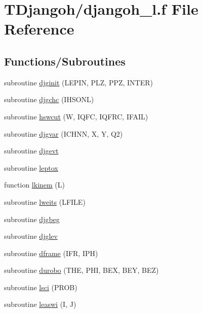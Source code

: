 \hypertarget{djangoh__l_8f}{\section{T\+Djangoh/djangoh\+\_\+l.f File Reference}
\label{djangoh__l_8f}
}
\subsection*{Functions/\+Subroutines}
\begin{DoxyCompactItemize}
\item 
subroutine \hyperlink{djangoh__l_8f_a398fcfae6bdeb7be322668b7cfc98878}{djginit} (L\+E\+P\+I\+N, P\+L\+Z, P\+P\+Z, I\+N\+T\+E\+R)
\item 
subroutine \hyperlink{djangoh__l_8f_a818c188c19621f059354054b7cfc8f5b}{djgchc} (I\+H\+S\+O\+N\+L)
\item 
subroutine \hyperlink{djangoh__l_8f_a5f0f05895586dd5880b80d2a36d647dc}{hswcut} (W, I\+Q\+F\+C, I\+Q\+F\+R\+C, I\+F\+A\+I\+L)
\item 
subroutine \hyperlink{djangoh__l_8f_a7d143aff9c64b502834443d7dc719784}{djgvar} (I\+C\+H\+N\+N, X, Y, Q2)
\item 
subroutine \hyperlink{djangoh__l_8f_aaef5d232aa8ab20561e8059749412c7c}{djgevt}
\item 
subroutine \hyperlink{djangoh__l_8f_a11067b9bff6d66852c24584cdc303b3c}{leptox}
\item 
function \hyperlink{djangoh__l_8f_a504b2325591f13f341edbbbf8cc70bfa}{lkinem} (L)
\item 
subroutine \hyperlink{djangoh__l_8f_a57410e89a3ce8563c8f3b4e5657ac043}{lweits} (L\+F\+I\+L\+E)
\item 
subroutine \hyperlink{djangoh__l_8f_ae6e9ed9cda4415025d1d496057a2d137}{djgbeg}
\item 
subroutine \hyperlink{djangoh__l_8f_af2c5433cb5aac85120afd2ae0ea3e0c6}{djglev}
\item 
subroutine \hyperlink{djangoh__l_8f_a2381dfce53fbaa48b3b2b9303fa19a97}{dframe} (I\+F\+R, I\+P\+H)
\item 
subroutine \hyperlink{djangoh__l_8f_a8d3e2719376add64f307b0aba47e7fd5}{durobo} (T\+H\+E, P\+H\+I, B\+E\+X, B\+E\+Y, B\+E\+Z)
\item 
subroutine \hyperlink{djangoh__l_8f_a0ef4bc1f4f8f3990591d560768601578}{lsci} (P\+R\+O\+B)
\item 
subroutine \hyperlink{djangoh__l_8f_aa0d60d651866fc5f7452303bd873a6e9}{leaswi} (I, J)

\end{DoxyCompactItemize}

